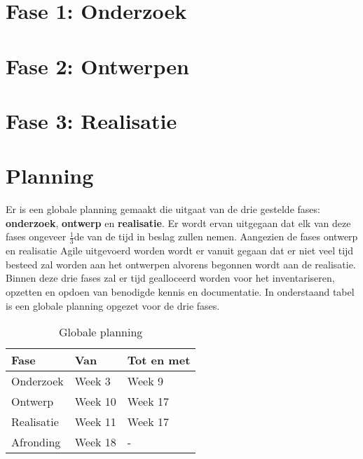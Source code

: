 \newpage
\section{Fase 1: Onderzoek}



\section{Fase 2: Ontwerpen}


\section{Fase 3: Realisatie}



\clearpage
\section{Planning}
Er is een globale planning gemaakt die uitgaat van de drie gestelde fases: \textbf{onderzoek}, \textbf{ontwerp} en \textbf{realisatie}. Er wordt ervan uitgegaan dat elk van deze fases ongeveer \( \frac{1}{3} \)de van de tijd in beslag zullen nemen. Aangezien de fases ontwerp en realisatie Agile uitgevoerd worden wordt er vanuit gegaan dat er niet veel tijd besteed zal worden aan het ontwerpen alvorens begonnen wordt aan de realisatie. Binnen deze drie fases zal er tijd gealloceerd worden voor het inventariseren, opzetten en opdoen van benodigde kennis en documentatie. In onderstaand tabel is een globale planning opgezet voor de drie fases.

\begin{table}[ht]
  \begin{tabular}{|p{6cm}|p{4cm}|p{4cm}|}
    \hline
    \textbf{Fase} & \textbf{Van} & \textbf{Tot en met} \\
    \hline
    Onderzoek & Week 3 & Week 9 \\
    \hline
    Ontwerp & Week 10 & Week 17 \\
    \hline
    Realisatie & Week 11 & Week 17 \\
    \hline
    Afronding & Week 18 & - \\
    \hline
  \end{tabular}
  \caption{Globale planning}
  \label{planning}
\end{table}

